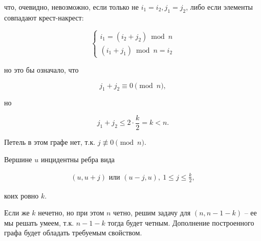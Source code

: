 	что, очевидно, невозможно, если только не $i_1 = i_2, j_1 = j_2$, либо если элементы совпадают крест-накрест:

	\begin{equation*}
		\begin{cases}
			i_1 = (i_2+j_2) \bmod n \\
			(i_1+j_1) \bmod n = i_2
		\end{cases}
	\end{equation*}

	но это бы означало, что

	\begin{equation*}
		j_1 + j_2 \equiv 0 \pmod n,
	\end{equation*}

	но

	\begin{equation*}
		j_1 + j_2 \le 2 \cdot \frac{k}{2} = k < n.
	\end{equation*}

	Петель в этом графе нет, т.к. $j \not\equiv 0 \pmod n$.

	Вершине $u$ инцидентны ребра вида 

	\begin{gather*}
		(u, u+j) \text{ или } (u-j, u), \ 1 \le j \le \frac{k}{2},
	\end{gather*}

	коих ровно $k$.

	Если же $k$ нечетно, но при этом $n$ четно, решим задачу для $(n, n-1-k)$ -- ее мы решать умеем, т.к. $n-1-k$ тогда будет четным. Дополнение построенного графа будет обладать требуемым свойством.





